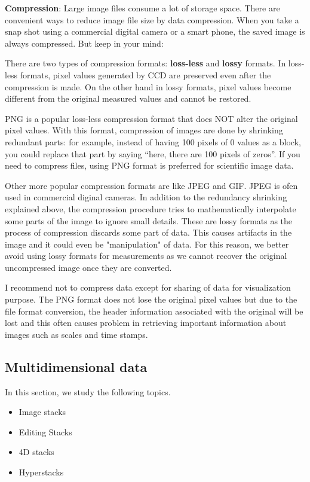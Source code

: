 \textbf{Compression}: Large image files consume a lot of storage space. There are convenient ways to reduce image file size by data compression. When you take a snap shot using a commercial digital camera or a smart phone, the saved image is always compressed.  
But keep in your mind:

There are two types of compression formats: \textbf{loss-less} and \textbf{lossy} formats. In loss-less formats, pixel values generated by CCD are preserved even after the compression is made. On the other hand in lossy formats, pixel values become different from the original measured values and cannot be restored. 

PNG is a popular loss-less compression format that does NOT alter the original pixel values. With this format, compression of images are done by shrinking redundant parts: for example, instead of having 100 pixels of 0 values as a block, you could replace that part by saying ``here, there are 100 pixels of zeros''. If you need to compress files, using PNG format is preferred for scientific image data.  

Other more popular compression formats are like JPEG and GIF. JPEG is ofen used in commercial diginal cameras.  In addition to the redundancy shrinking explained above, the compression procedure tries to mathematically interpolate some parts of the image to ignore small details. These are lossy formats as
the process of compression discards some part of data. This causes artifacts in the image and it could even be "manipulation" of data. For this reason, we better avoid using lossy formats
for measurements as we cannot recover the original uncompressed image once they are converted. 

I recommend not to compress data except for sharing of data for visualization purpose. The PNG format does not lose the original pixel values but due to the file format conversion, the header information associated with the original will be lost and this often causes problem in retrieving important information about images such as scales and time stamps. 

\subsection{Multidimensional data}
\label{sec:stackBasics}

In this section, we study the following topics.

\begin{itemize}
    \item Image stacks
    \item Editing Stacks
    \item 4D stacks
	\item Hyperstacks
\end{itemize}

